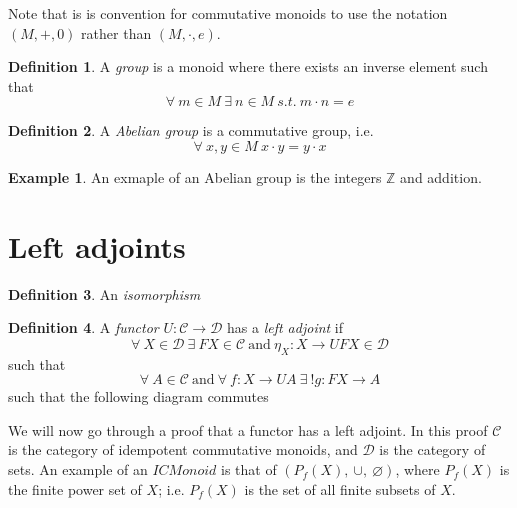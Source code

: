 \documentclass{article}
\theoremstyle{definition}
\newtheorem{definition}{Definition}[section]
\newtheorem{example}{Example}[section]
\begin{document}
Note that is is convention for commutative monoids to use the notation
$(M,+,0)$ rather than $(M,\cdot,e)$.

\begin{definition}
	A \textit{group} is a monoid where there exists an inverse element such that
	$$\forall\ m \in M\ \exists\ n \in M\ s.t.\ m \cdot n = e$$
\end{definition}

\begin{definition}
	A \textit{Abelian group} is a commutative group, i.e.
	$$\forall\ x, y \in M\ x \cdot y = y \cdot x$$
\end{definition}

\begin{example}
	An exmaple of an Abelian group is the integers $\mathbb{Z}$ and addition.
\end{example}

\section{Left adjoints}

\begin{definition}
	An \textit{isomorphism}
\end{definition}

\begin{definition}
	A \textit{functor} $U : \mathcal{C} \rightarrow \mathcal{D}$ has a \textit{left adjoint} if
		$$
		\forall\ X \in \mathcal{D}
		\ \exists
		\ FX \in \mathcal{C} \ \textrm{and}\ \eta_X : X \rightarrow UFX \in \mathcal{D}
		$$
		such that
		$$
		\forall\ A \in \mathcal{C}\ \textrm{and}\ \forall\ f : X \rightarrow UA
		\ \exists
		\ !g : FX \rightarrow A
		$$
		such that the following diagram commutes
\end{definition}

\begin{center}
\end{center}

We will now go through a proof that a functor has a left adjoint.
In this proof $\mathcal{C}$ is the category of idempotent commutative monoids,
and $\mathcal{D}$ is the category of sets.
An example of an $ICMonoid$ is that of $(P_f(X),\ \cup,\ \varnothing)$,
where $P_f(X)$ is the finite power set of $X$;
i.e. $P_f(X)$ is the set of all finite subsets of $X$.
\end{document}
